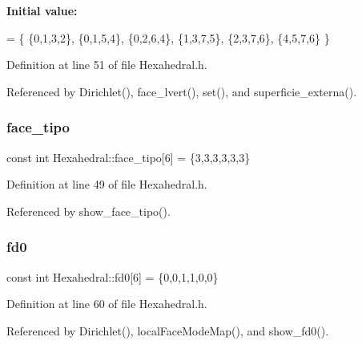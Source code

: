 {\bfseries Initial value\+:}
\begin{DoxyCode}
= 
   \{ \{0,1,3,2\},
     \{0,1,5,4\},
     \{0,2,6,4\},
     \{1,3,7,5\},
     \{2,3,7,6\},
     \{4,5,7,6\} 
   \}
\end{DoxyCode}


Definition at line 51 of file Hexahedral.\+h.



Referenced by Dirichlet(), face\+\_\+lvert(), set(), and superficie\+\_\+externa().

\mbox{\label{classHexahedral_a94a89e53e7dd2f1d490205e97a2a82d8}} 
\subsubsection{\texorpdfstring{face\+\_\+tipo}{face\_tipo}}
{\footnotesize\ttfamily const int Hexahedral\+::face\+\_\+tipo\mbox{[}6\mbox{]} = \{3,3,3,3,3,3\}\hspace{0.3cm}{\ttfamily [private]}}



Definition at line 49 of file Hexahedral.\+h.



Referenced by show\+\_\+face\+\_\+tipo().

\mbox{\label{classHexahedral_a39fe746c1ec3283acf9748af64a6252c}} 
\subsubsection{\texorpdfstring{fd0}{fd0}}
{\footnotesize\ttfamily const int Hexahedral\+::fd0\mbox{[}6\mbox{]} = \{0,0,1,1,0,0\}\hspace{0.3cm}{\ttfamily [private]}}



Definition at line 60 of file Hexahedral.\+h.



Referenced by Dirichlet(), local\+Face\+Mode\+Map(), and show\+\_\+fd0().

\mbox{\label{classHexahedral_a9f60ba5d3fbfabfad6fb34516ed3b685}} 
